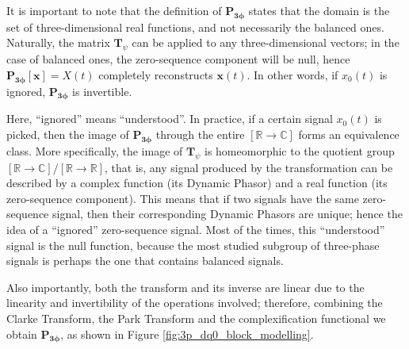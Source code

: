 	It is important to note that the definition of $\mathbf{P_{3\phi}}$ states that the domain is the set of three-dimensional real functions, and not necessarily the balanced ones. Naturally, the matrix $\mathbf{T}_{\psi}$ can be applied to any three-dimensional vectors; in the case of balanced ones, the zero-sequence component will be null, hence $\mathbf{P_{3\phi}}\left[\mathbf{x}\right] = X(t)$ completely reconstructs $\mathbf{x}(t)$. In other words, if $x_0(t)$ is ignored, $\mathbf{P_{3\phi}}$ is invertible.

	Here, ``ignored'' means ``understood''. In practice, if a certain signal $x_0(t)$ is picked, then the image of $\mathbf{P_{3\phi}}$ through the entire $\left[\mathbb{R}\to\mathbb{C}\right]$ forms an equivalence class. More specifically, the image of $\mathbf{T}_\psi$ is homeomorphic to the quotient group $\left[\mathbb{R}\to\mathbb{C}\right]/\left[\mathbb{R}\to\mathbb{R}\right]$, that is, any signal produced by the transformation can be described by a complex function (its Dynamic Phasor) and a real function (its zero-sequence component). This means that if two signals have the same zero-sequence signal, then their corresponding Dynamic Phasors are unique; hence the idea of a ``ignored'' zero-sequence signal. Most of the times, this ``understood'' signal is the null function, because the most studied subgroup of three-phase signals is perhaps the one that contains balanced signals.

	Also importantly, both the transform and its inverse are linear due to the linearity and invertibility of the operations involved; therefore, combining the Clarke Transform, the Park Transform and the complexification functional we obtain $\mathbf{P_{3\phi}}$, as shown in Figure \ref{fig:3p_dq0_block_modelling}.

